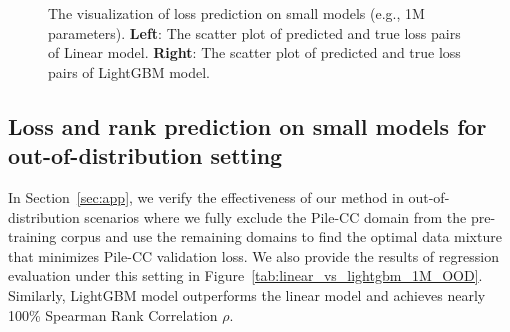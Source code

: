 \begin{figure}[t]
    \centering
    \caption{The visualization of loss prediction on small models (e.g., 1M parameters). \textbf{Left}: The scatter plot of predicted and true loss pairs of Linear model. \textbf{Right}: The scatter plot of predicted and true loss pairs of LightGBM model.}
    \label{fig:1M-to-128-1M-Joint}
\end{figure}


\subsection{Loss and rank prediction on small models for out-of-distribution setting}

In Section~\ref{sec:app}, we verify the effectiveness of our method in out-of-distribution scenarios where we fully exclude the Pile-CC domain from the pre-training corpus and use the remaining domains to find the optimal data mixture that minimizes Pile-CC validation loss. 
We also provide the results of regression evaluation under this setting in Figure~\ref{tab:linear_vs_lightgbm_1M_OOD}.
Similarly, LightGBM model outperforms the linear model and achieves nearly 100\% Spearman Rank Correlation $\rho$.

